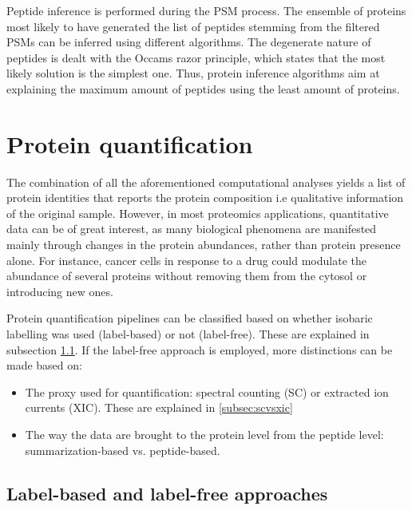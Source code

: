 \documentclass[11pt, a4paper]{report}
\begin{document}
Peptide inference is performed during the PSM process. The ensemble of proteins most likely to have generated the list of peptides stemming from the filtered PSMs can be inferred using different algorithms. The degenerate nature of peptides is dealt with the Occam\textquotesingle s razor principle, which states that the most likely solution is the simplest one. Thus, protein inference algorithms aim at explaining the maximum amount of peptides using the least amount of proteins.

\section{Protein quantification}
\label{sec:quantification}

The combination of all the aforementioned computational analyses yields a list of protein identities that reports the protein composition i.e qualitative information of the original sample. However, in most proteomics applications, quantitative data can be of great interest, as many biological phenomena are manifested mainly through changes in the protein abundances, rather than protein presence alone. For instance, cancer cells in response to a drug could modulate the abundance of several proteins without removing them from the cytosol or introducing new ones.

Protein quantification pipelines can be classified based on whether isobaric labelling was used (label-based) or not (label-free). These are explained in subsection \ref{subsec:labelling}. If the label-free approach is employed, more distinctions can be made based on:

\begin{itemize}
\item The proxy used for quantification: spectral counting (\ac{SC}) or extracted ion currents (\ac{XIC}). These are explained in \ref{subsec:scvsxic}


\item The way the data are brought to the protein level from the peptide level: summarization-based vs. peptide-based.
\end{itemize}

\subsection{Label-based and label-free approaches}
\label{subsec:labelling}
\end{document}
